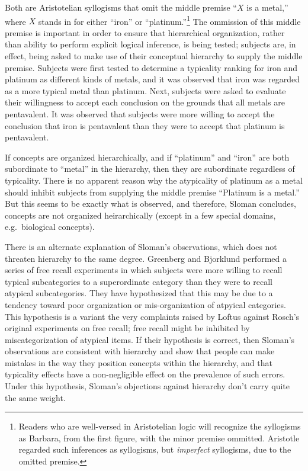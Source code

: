 Both are Aristotelian syllogisms that omit the middle premise ``$X$ is a metal,'' where $X$ stands in for either ``iron'' or ``platinum.''\footnote{Readers who are well-versed in Aristotelian logic will recognize the syllogisms as Barbara, from the first figure, with the minor premise ommitted. Aristotle regarded such inferences as syllogisms, but \emph{imperfect} syllogisms, due to the omitted premise.} The ommission of this middle premise is important in order to ensure that hierarchical organization, rather than ability to perform explicit logical inference, is being tested; subjects are, in effect, being asked to make use of their conceptual hierarchy to supply the middle premise. Subjects were first tested to determine a typicality ranking for iron and platinum as different kinds of metals, and it was observed that iron was regarded as a more typical metal than platinum. Next, subjects were asked to evaluate their willingness to accept each conclusion on the grounds that all metals are pentavalent. It was observed that subjects were more willing to accept the conclusion that iron is pentavalent than they were to accept that platinum is pentavalent.

If concepts are organized hierarchically, and if ``platinum'' and ``iron'' are both subordinate to ``metal'' in the hierarchy, then they are subordinate regardless of typicality. There is no apparent reason why the atypicality of platinum as a metal should inhibit subjects from supplying the middle premise ``Platinum is a metal.'' But this seems to be exactly what is observed, and therefore, Sloman concludes, concepts are not organized heirarchically (except in a few special domains, e.g.\ biological concepts).

There is an alternate explanation of Sloman's observations, which does not threaten hierarchy to the same degree. Greenberg and Bjorklund \cite{greenberg_category_1981} performed a series of free recall experiments in which subjects were more willing to recall typical subcategories to a superordinate category than they were to recall atypical subcategories. They have hypothesized that this may be due to a tendency toward poor organization or mis-organization of atpyical categories. This hypothesis is a variant  the very complaints raised by Loftus \cite{loftus_spreading_1975} against Rosch's original experiments on free recall; free recall might be inhibited by miscategorization of atypical items. If their hypothesis is correct, then Sloman's observations are consistent with hierarchy and show that people can make mistakes in the way they position concepts within the hierarchy, and that typicality effects have a non-negligible effect on the prevalence of such errors. Under this hypothesis, Sloman's objections against hierarchy don't carry quite the same weight.

